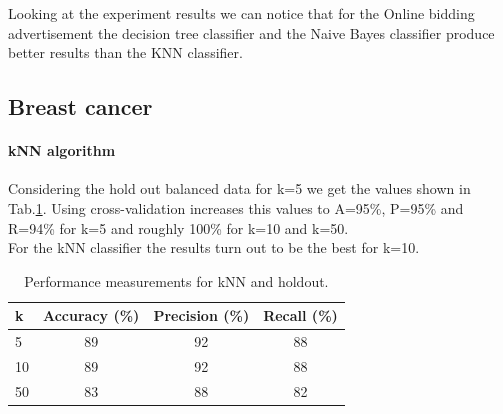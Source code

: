 \documentclass{article}
\begin{document}
Looking at the experiment results we can notice that for the Online bidding advertisement the decision tree classifier and the Naive Bayes classifier produce better results than the KNN classifier.





\subsection{Breast cancer}


\paragraph{kNN algorithm }

Considering the hold out balanced data for k=5 we get the values shown in Tab.\ref{tab:perf_kNN_breast}. Using cross-validation increases this values to A=95\%, P=95\% and R=94\% for k=5 and roughly 100\% for k=10 and k=50. \\
For the kNN classifier the results turn out to be the best for k=10.

\begin{table}[h!]
		\centering
    \begin{tabular}{ l c c c }
        \toprule
        \textbf{k} & \textbf{Accuracy (\%)} & \textbf{Precision (\%)} & \textbf{Recall (\%)} \\
        \toprule
				5 & 89 & 92 & 88 \\
				10 & 89 & 92 & 88 \\
				50 & 83 & 88 & 82 \\
        \bottomrule
    \end{tabular}
		\caption{Performance measurements for kNN and holdout.}
		\label{tab:perf_kNN_breast}
\end{table}
\end{document}
